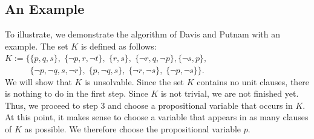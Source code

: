 \subsection{An Example}
To illustrate, we demonstrate the algorithm of Davis and Putnam with an example.
The set $K$ is defined as follows: \\[0.2cm]
\hspace*{1.3cm}
$K := \Big\{ \{p, q, s\},\; \{\neg p, r, \neg t\},\; \{r, s\},\; \{\neg r, q, \neg p\}, 
             \{\neg s, p\},$ \\
\hspace*{1.3cm}
$\phantom{K := \Big\{}\{\neg p, \neg q, s, \neg r\},\; \{p, \neg q, s\},\; \{\neg r, \neg s\},\;
             \{\neg p, \neg s\} 
      \Big\}$. 
\\[0.2cm]
We will show that $K$ is unsolvable. Since the
set $K$ contains no unit clauses, there is nothing to do in the first step. Since $K$ is not
trivial, we are not finished yet. Thus, we proceed to step 3 and choose
a propositional variable that occurs in $K$. At this point, it makes sense
to choose a variable that appears in as many clauses of $K$ as possible. We therefore choose
the propositional variable $p$.
